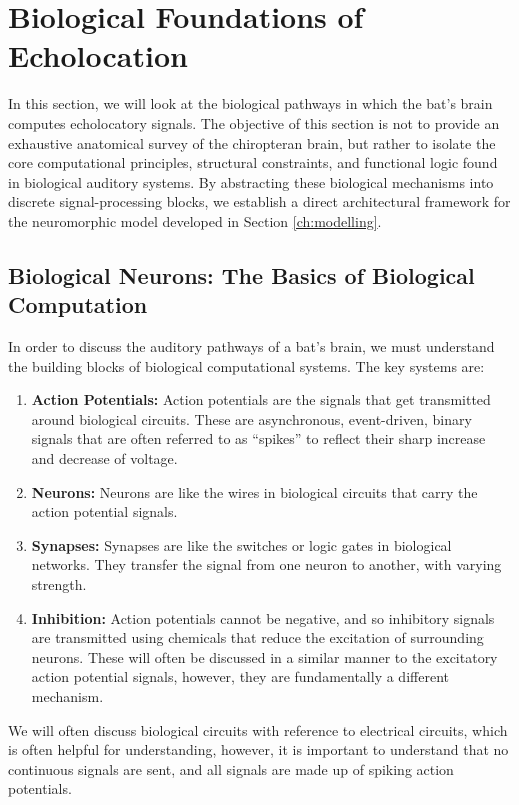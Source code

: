 \section{Biological Foundations of Echolocation} \label{sec:biology}

In this section, we will look at the biological pathways in which the bat's brain computes echolocatory signals. The objective of this section is not to provide an exhaustive anatomical survey of the chiropteran brain, but rather to isolate the core computational principles, structural constraints, and functional logic found in biological auditory systems. By abstracting these biological mechanisms into discrete signal-processing blocks, we establish a direct architectural framework for the neuromorphic model developed in Section \ref{ch:modelling}. 


\subsection{Biological Neurons: The Basics of Biological Computation}

In order to discuss the auditory pathways of a bat's brain, we must understand the building blocks of biological computational systems. The key systems are:
\begin{enumerate}
    \item \textbf{Action Potentials:} Action potentials are the signals that get transmitted around biological circuits. These are asynchronous, event-driven, binary signals that are often referred to as ``spikes'' to reflect their sharp increase and decrease of voltage.
    \item \textbf{Neurons:} Neurons are like the wires in biological circuits that carry the action potential signals.
    \item \textbf{Synapses:} Synapses are like the switches or logic gates in biological networks. They transfer the signal from one neuron to another, with varying strength.
    \item \textbf{Inhibition:} Action potentials cannot be negative, and so inhibitory signals are transmitted using chemicals that reduce the excitation of surrounding neurons. These will often be discussed in a similar manner to the excitatory action potential signals, however, they are fundamentally a different mechanism.
\end{enumerate}
We will often discuss biological circuits with reference to electrical circuits, which is often helpful for understanding, however, it is important to understand that no continuous signals are sent, and all signals are made up of spiking action potentials.

